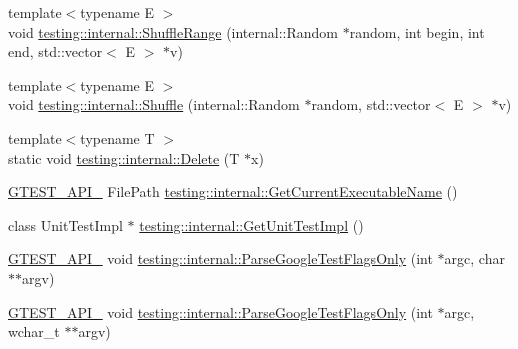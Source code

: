 \begin{DoxyCompactItemize}
\item 
{\footnotesize template$<$typename E $>$ }\\void \hyperlink{namespacetesting_1_1internal_a0e1d3dc36138a591769412d4c7779861}{testing\+::internal\+::\+Shuffle\+Range} (internal\+::\+Random $\ast$random, int begin, int end, std\+::vector$<$ E $>$ $\ast$v)
\item 
{\footnotesize template$<$typename E $>$ }\\void \hyperlink{namespacetesting_1_1internal_a90d9e6ffe8522a7eb1b2ce9b1a0c4673}{testing\+::internal\+::\+Shuffle} (internal\+::\+Random $\ast$random, std\+::vector$<$ E $>$ $\ast$v)
\item 
{\footnotesize template$<$typename T $>$ }\\static void \hyperlink{namespacetesting_1_1internal_a1e7045e09392aece10aea4517458b7ed}{testing\+::internal\+::\+Delete} (T $\ast$x)
\item 
\hyperlink{gtest-port_8h_aa73be6f0ba4a7456180a94904ce17790}{G\+T\+E\+S\+T\+\_\+\+A\+P\+I\+\_\+} File\+Path \hyperlink{namespacetesting_1_1internal_a7a2bbf069f75bc99873976ad6fc356ad}{testing\+::internal\+::\+Get\+Current\+Executable\+Name} ()
\item 
class Unit\+Test\+Impl $\ast$ \hyperlink{namespacetesting_1_1internal_a9bd0caf5d16512de38b39599c13ee634}{testing\+::internal\+::\+Get\+Unit\+Test\+Impl} ()
\item 
\hyperlink{gtest-port_8h_aa73be6f0ba4a7456180a94904ce17790}{G\+T\+E\+S\+T\+\_\+\+A\+P\+I\+\_\+} void \hyperlink{namespacetesting_1_1internal_a472880afbcc592a41e3d623e2dec8412}{testing\+::internal\+::\+Parse\+Google\+Test\+Flags\+Only} (int $\ast$argc, char $\ast$$\ast$argv)
\item 
\hyperlink{gtest-port_8h_aa73be6f0ba4a7456180a94904ce17790}{G\+T\+E\+S\+T\+\_\+\+A\+P\+I\+\_\+} void \hyperlink{namespacetesting_1_1internal_aa3c81a67914856448d0778990d9d9cab}{testing\+::internal\+::\+Parse\+Google\+Test\+Flags\+Only} (int $\ast$argc, wchar\+\_\+t $\ast$$\ast$argv)
\end{DoxyCompactItemize}
